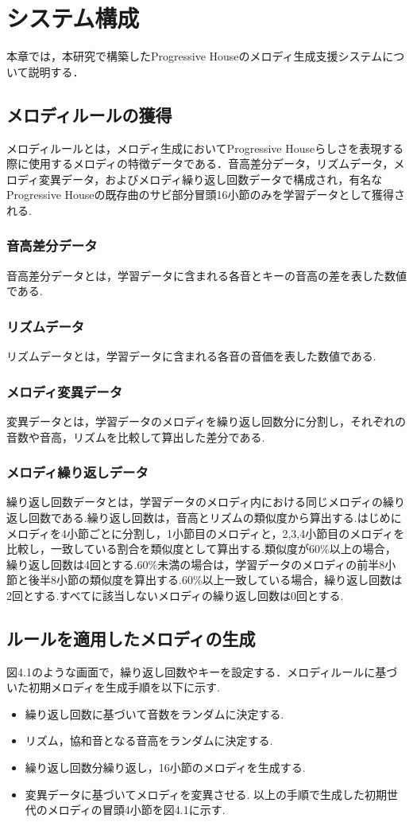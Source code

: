 \chapter{システム構成}
本章では，本研究で構築したProgressive Houseのメロディ生成支援システムについて説明する．

\section{メロディルールの獲得}
メロディルールとは，メロディ生成においてProgressive Houseらしさを表現する際に使用するメロディの特徴データである．音高差分データ，リズムデータ，メロディ変異データ，およびメロディ繰り返し回数データで構成され，有名なProgressive Houseの既存曲のサビ部分冒頭16小節のみを学習データとして獲得される.
\subsection{音高差分データ}
音高差分データとは，学習データに含まれる各音とキーの音高の差を表した数値である.
\subsection{リズムデータ}
リズムデータとは，学習データに含まれる各音の音価を表した数値である.
\subsection{メロディ変異データ}
変異データとは，学習データのメロディを繰り返し回数分に分割し，それぞれの音数や音高，リズムを比較して算出した差分である.
\subsection{メロディ繰り返しデータ}
繰り返し回数データとは，学習データのメロディ内における同じメロディの繰り返し回数である.繰り返し回数は，音高とリズムの類似度から算出する.はじめにメロディを4小節ごとに分割し，1小節目のメロディと，2,3,4小節目のメロディを比較し，一致している割合を類似度として算出する.類似度が60\%以上の場合，繰り返し回数は4回とする.60\%未満の場合は，学習データのメロディの前半8小節と後半8小節の類似度を算出する.60\%以上一致している場合，繰り返し回数は2回とする.すべてに該当しないメロディの繰り返し回数は0回とする.

\section{ルールを適用したメロディの生成}
図4.1のような画面で，繰り返し回数やキーを設定する．メロディルールに基づいた初期メロディを生成手順を以下に示す.
\begin{itemize}
  \item 繰り返し回数に基づいて音数をランダムに決定する.
  \item リズム，協和音となる音高をランダムに決定する.
  \item 繰り返し回数分繰り返し，16小節のメロディを生成する.
  \item 変異データに基づいてメロディを変異させる. 以上の手順で生成した初期世代のメロディの冒頭4小節を図4.1に示す.
\end{itemize}

